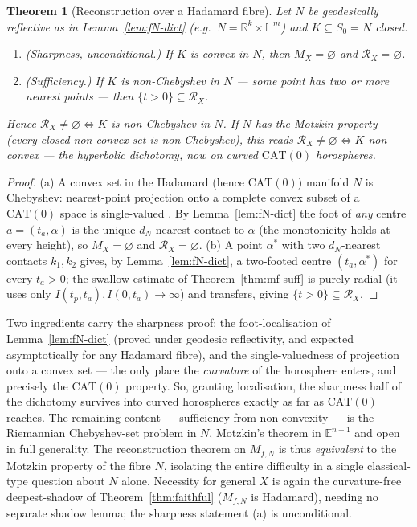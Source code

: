 \documentclass[11pt]{article}
\newtheorem{theorem}{Theorem}[section]
\theoremstyle{remark}
\newcommand{\R}{\mathbb{R}}
\newcommand{\X}{X}
\newcommand{\Mx}{M_{\X}}
\newcommand{\Rx}{\mathcal{R}_{\X}}
\newcommand{\E}{\mathbb{E}}
\newcommand{\HH}{\mathbb{H}}
\begin{document}
\begin{theorem}[Reconstruction over a Hadamard fibre]\label{thm:fN}
Let $N$ be geodesically reflective as in Lemma~\ref{lem:fN-dict} (e.g.\
$N=\R^{k}\times\HH^{m}$) and $K\subseteq S_{0}=N$ closed.
\begin{enumerate}[label=\textup{(\alph*)}]
\item \emph{(Sharpness, unconditional.)} If $K$ is convex in $N$, then
$\Mx=\varnothing$ and $\Rx=\varnothing$.
\item \emph{(Sufficiency.)} If $K$ is non-Chebyshev in $N$ --- some
point has two or more nearest points --- then $\{t>0\}\subseteq\Rx$.
\end{enumerate}
Hence $\Rx\neq\varnothing\iff K$ is non-Chebyshev in $N$. If $N$ has
the \emph{Motzkin property} (every closed non-convex set is
non-Chebyshev), this reads $\Rx\neq\varnothing\iff K$ non-convex ---
the hyperbolic dichotomy, now on curved $\mathrm{CAT}(0)$ horospheres.
\end{theorem}

\begin{proof}
(a) A convex set in the Hadamard (hence $\mathrm{CAT}(0)$) manifold $N$
is Chebyshev: nearest-point projection onto a complete convex subset of
a $\mathrm{CAT}(0)$ space is single-valued \cite[II.2.4]{BH}. By
Lemma~\ref{lem:fN-dict} the foot of \emph{any} centre
$a=(t_{a},\alpha)$ is the unique $d_{N}$-nearest contact to $\alpha$
(the monotonicity holds at every height), so $\Mx=\varnothing$ and
$\Rx=\varnothing$. (b) A point $\alpha^{\ast}$ with two $d_{N}$-nearest
contacts $k_{1},k_{2}$ gives, by Lemma~\ref{lem:fN-dict}, a two-footed
centre $(t_{a},\alpha^{\ast})$ for every $t_{a}>0$; the swallow
estimate of Theorem~\ref{thm:mf-suff} is purely radial (it uses only
$I(t_{p},t_{a}),I(0,t_{a})\to\infty$) and transfers, giving
$\{t>0\}\subseteq\Rx$.
\end{proof}

Two ingredients carry the sharpness proof: the foot-localisation of
Lemma~\ref{lem:fN-dict} (proved under geodesic reflectivity, and
expected asymptotically for any Hadamard fibre), and the
single-valuedness of projection onto a convex set --- the only place
the \emph{curvature} of the horosphere enters, and precisely the
$\mathrm{CAT}(0)$ property. So, granting localisation, the sharpness
half of the dichotomy survives into curved horospheres exactly as far
as $\mathrm{CAT}(0)$ reaches. The remaining content --- sufficiency
from non-convexity --- is the Riemannian Chebyshev-set problem in $N$,
Motzkin's theorem in $\E^{n-1}$ and open in full generality. The
reconstruction theorem on $M_{f,N}$ is thus \emph{equivalent} to the
Motzkin property of the fibre $N$, isolating the entire difficulty in a
single classical-type question about $N$ alone. Necessity for general
$\X$ is again the curvature-free deepest-shadow of
Theorem~\ref{thm:faithful} ($M_{f,N}$ is Hadamard), needing no separate
shadow lemma; the sharpness statement (a) is unconditional.
\end{document}
